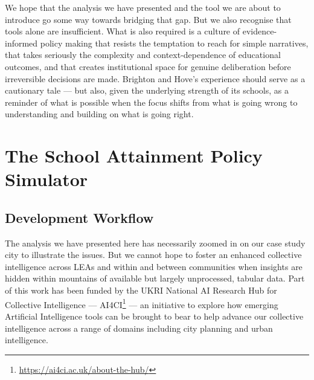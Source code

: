 \documentclass[
  11pt,
]{article}
\begin{document}
We hope that the analysis we have presented and the tool we are about to
introduce go some way towards bridging that gap. But we also recognise
that tools alone are insufficient. What is also required is a culture of
evidence-informed policy making that resists the temptation to reach for
simple narratives, that takes seriously the complexity and
context-dependence of educational outcomes, and that creates
institutional space for genuine deliberation before irreversible
decisions are made. Brighton and Hove's experience should serve as a
cautionary tale --- but also, given the underlying strength of its
schools, as a reminder of what is possible when the focus shifts from
what is going wrong to understanding and building on what is going
right.

\section{The School Attainment Policy
Simulator}\label{the-school-attainment-policy-simulator}

\subsection{Development Workflow}\label{development-workflow}

The analysis we have presented here has necessarily zoomed in on our
case study city to illustrate the issues. But we cannot hope to foster
an enhanced collective intelligence across LEAs and within and between
communities when insights are hidden within mountains of available but
largely unprocessed, tabular data. Part of this work has been funded by
the UKRI National AI Research Hub for Collective Intelligence ---
AI4CI\footnote{\url{https://ai4ci.ac.uk/about-the-hub/}} --- an
initiative to explore how emerging Artificial Intelligence tools can be
brought to bear to help advance our collective intelligence across a
range of domains including city planning and urban intelligence.
\end{document}
